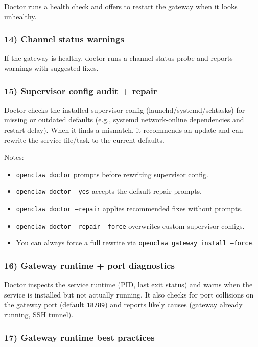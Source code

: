 Doctor runs a health check and offers to restart the gateway when it looks
unhealthy.

\subsubsection{14) Channel status warnings}


If the gateway is healthy, doctor runs a channel status probe and reports
warnings with suggested fixes.

\subsubsection{15) Supervisor config audit + repair}


Doctor checks the installed supervisor config (launchd/systemd/schtasks) for
missing or outdated defaults (e.g., systemd network-online dependencies and
restart delay). When it finds a mismatch, it recommends an update and can
rewrite the service file/task to the current defaults.

Notes:

\begin{itemize}
  \item \texttt{openclaw doctor} prompts before rewriting supervisor config.
  \item \texttt{openclaw doctor --yes} accepts the default repair prompts.
  \item \texttt{openclaw doctor --repair} applies recommended fixes without prompts.
  \item \texttt{openclaw doctor --repair --force} overwrites custom supervisor configs.
  \item You can always force a full rewrite via \texttt{openclaw gateway install --force}.
\end{itemize}


\subsubsection{16) Gateway runtime + port diagnostics}


Doctor inspects the service runtime (PID, last exit status) and warns when the
service is installed but not actually running. It also checks for port collisions
on the gateway port (default \texttt{18789}) and reports likely causes (gateway already
running, SSH tunnel).

\subsubsection{17) Gateway runtime best practices}


